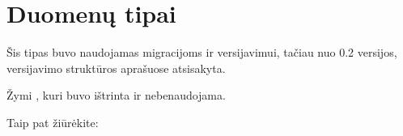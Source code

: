 \documentclass[letterpaper,10pt,lithuanian]{sphinxmanual}
\begin{document}
\sphinxstepscope


\section{Duomenų tipai}
\label{\detokenize{tipai:module-type}}\label{\detokenize{tipai:id1}}\label{\detokenize{tipai:duomenu-tipai}}\label{\detokenize{tipai::doc}}

\begin{fulllineitems}
\label{\detokenize{tipai:type.absent}}
\pysigstartsignatures
{}
\pysigstopsignatures
\sphinxAtStartPar
{}Šis tipas buvo naudojamas migracijoms ir versijavimui, tačiau nuo 0.2
versijos, versijavimo struktūros aprašuose atsisakyta.

\sphinxAtStartPar
Žymi {\hyperref[\detokenize{dimensijos:property}]{}}, kuri buvo ištrinta ir nebenaudojama.


\begin{sphinxseealso}{Taip pat žiūrėkite:}

\sphinxAtStartPar
{\hyperref[\detokenize{dimensijos:migrate}]{}}


\end{sphinxseealso}


\end{fulllineitems}

\end{document}
